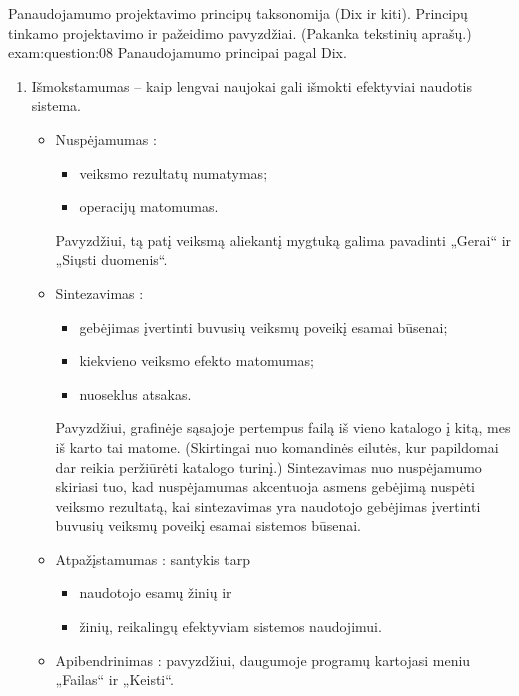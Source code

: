 \begin{question}{%
  Panaudojamumo projektavimo principų taksonomija (Dix ir kiti).
  Principų tinkamo projektavimo ir pažeidimo pavyzdžiai. (Pakanka
  tekstinių aprašų.)
  }{exam:question:08}
  Panaudojamumo principai pagal Dix.
  \begin{enumerate}
    \item Išmokstamumas  – kaip lengvai naujokai gali
      išmokti efektyviai naudotis sistema.
      \begin{itemize}
        \item Nuspėjamumas :
          \begin{itemize}
            \item veiksmo rezultatų numatymas;
            \item operacijų matomumas.
          \end{itemize}
          Pavyzdžiui, tą patį veiksmą aliekantį mygtuką galima
          pavadinti „Gerai“ ir „Siųsti duomenis“.
        \item Sintezavimas :
          \begin{itemize}
            \item gebėjimas įvertinti buvusių veiksmų poveikį esamai
              būsenai;
            \item kiekvieno veiksmo efekto matomumas;
            \item nuoseklus atsakas.
          \end{itemize}
          Pavyzdžiui, grafinėje sąsajoje pertempus failą iš vieno katalogo
          į kitą, mes iš karto tai matome. (Skirtingai nuo komandinės
          eilutės, kur papildomai dar reikia peržiūrėti katalogo turinį.)
          Sintezavimas nuo nuspėjamumo skiriasi tuo, kad nuspėjamumas
          akcentuoja asmens gebėjimą nuspėti veiksmo rezultatą, kai
          sintezavimas yra naudotojo gebėjimas įvertinti buvusių veiksmų
          poveikį esamai sistemos būsenai.
        \item Atpažįstamumas : santykis tarp
          \begin{itemize}
            \item naudotojo esamų žinių ir
            \item žinių, reikalingų efektyviam sistemos naudojimui.
          \end{itemize}
        \item Apibendrinimas : pavyzdžiui,
          daugumoje programų kartojasi meniu „Failas“ ir „Keisti“.

\end{itemize}
\end{enumerate}
\end{question}
